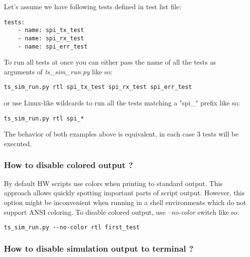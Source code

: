 \documentclass{tropic_design_spec}
\begin{document}
Let's assume we have following tests defined in test list file:

\begin{lstlisting}
tests:
    - name: spi_tx_test
    - name: spi_rx_test
    - name: spi_err_test
\end{lstlisting}

To run all tests at once you can either pass the name of all the tests as arguments of
\textit{ts_sim_run.py} like so:

\begin{lstlisting}
ts_sim_run.py rtl spi_tx_test spi_rx_test spi_err_test
\end{lstlisting}

or use Linux-like wildcards to run all the tests matching a "spi_" prefix like so:

\begin{lstlisting}
ts_sim_run.py rtl spi_*
\end{lstlisting}

The behavior of both examples above is equivalent, in each case 3 tests will be
executed.


\subsubsection{How to disable colored output ?}
\label{sec:how-to-disable-colored-output}

By default HW scripts use colors when printing to standard output. This approach
allows quickly spotting important parts of script output. However, this option
might be inconvenient when running in a shell environments which do not support
ANSI coloring. To disable colored output, use \textit{--no-color} switch like so:

\begin{lstlisting}
ts_sim_run.py --no-color rtl first_test
\end{lstlisting}


\subsubsection{How to disable simulation output to terminal ?}
\label{sec:how-to-disable-simulation-output-to-terminal}
\end{document}
